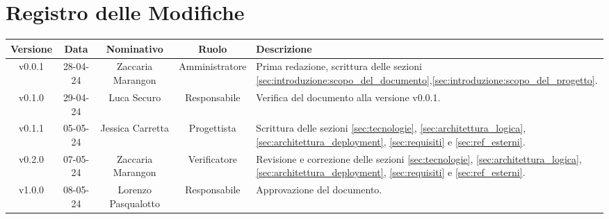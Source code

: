 \section*{\Large Registro delle Modifiche}
    \begin{table}[h]
        \centering
        \renewcommand\tabularxcolumn[1]{m{#1}} %
        \renewcommand{\arraystretch}{1.5}
        \begin{tabularx}{0.98\textwidth}
            {c|c|c|c|>{\centering\arraybackslash}X}
            \rowcolor{black}
            \textbf{\color{white} Versione} & \textbf{\color{white} Data} & \textbf{\color{white} Nominativo} & \textbf{\color{white} Ruolo} & \textbf{\color{white} Descrizione} \\ 
            \hline

            v0.0.1 & 28-04-24 & Zaccaria Marangon & Amministratore & Prima redazione, scrittura delle sezioni \ref{sec:introduzione:scopo_del_documento},\ref{sec:introduzione:scopo_del_progetto}. \\
            v0.1.0 & 29-04-24 & Luca Securo & Responsabile & Verifica del documento alla versione v0.0.1. \\
            v0.1.1 & 05-05-24 & Jessica Carretta & Progettista & Scrittura delle sezioni \ref{sec:tecnologie}, \ref{sec:architettura_logica}, \ref{sec:architettura_deployment}, \ref{sec:requisiti} e \ref{sec:ref_esterni}.\\
            v0.2.0 & 07-05-24 & Zaccaria Marangon & Verificatore & Revisione e correzione delle sezioni \ref{sec:tecnologie}, \ref{sec:architettura_logica}, \ref{sec:architettura_deployment}, \ref{sec:requisiti} e \ref{sec:ref_esterni}. \\
            v1.0.0 & 08-05-24 & Lorenzo Pasqualotto & Responsabile & Approvazione del documento.\\
            \hline
        \end{tabularx}
    \end{table}